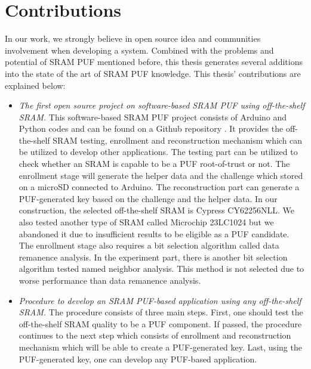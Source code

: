 \section{Contributions}
In our work, we strongly believe in open source idea and communities involvement when developing a system. Combined with the problems and potential of SRAM PUF mentioned before,
this thesis generates several additions into the state of the art of SRAM PUF knowledge. This thesis' contributions are explained below:
\begin{itemize}
    \item \textit{The first open source project on software-based SRAM PUF using off-the-shelf SRAM.}
    This software-based SRAM PUF project consists of Arduino and Python codes and can be found on a Github repository \cite{repository}. It provides the off-the-shelf SRAM testing, enrollment and reconstruction mechanism which can be utilized to develop other applications. The testing part can be utilized to check whether an SRAM is capable to be a PUF root-of-trust or not. The enrollment stage will generate the helper data and the challenge which stored on a microSD connected to Arduino. The reconstruction part can generate a PUF-generated key based on the challenge and the helper data. In our construction, the selected off-the-shelf SRAM is Cypress CY62256NLL. We also tested another type of SRAM called Microchip 23LC1024 but we abandoned it due to insufficient results to be eligible as a PUF candidate. The enrollment stage also requires a bit selection algorithm called data remanence analysis. In the experiment part, there is another bit selection algorithm tested named neighbor analysis. This method is not selected due to worse performance than data remanence analysis.
    \item \textit{Procedure to develop an SRAM PUF-based application using any off-the-shelf SRAM.} The procedure consists of three main steps. First, one should test the off-the-shelf SRAM quality to be a PUF component. If passed, the procedure continues to the next step which consists of enrollment and reconstruction mechanism which will be able to create a PUF-generated key. Last, using the PUF-generated key, one can develop any PUF-based application.

\end{itemize}
